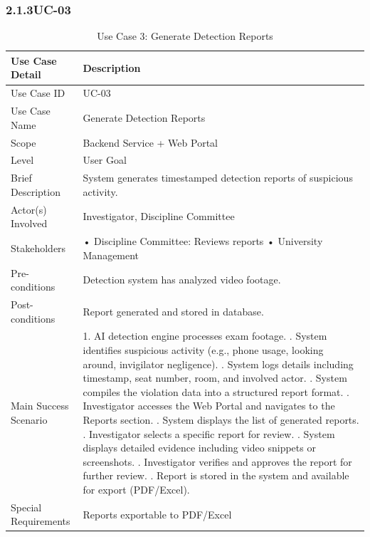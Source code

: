 \clearpage

\subsubsection*{2.1.3\quad UC-03}
\begin{longtable}{|p{5cm}|p{10cm}|}
\caption{Use Case 3: Generate Detection Reports}\label{uc03} \\
\hline
\textbf{Use Case Detail} & \textbf{Description} \\ \hline
Use Case ID & UC-03 \\ \hline
Use Case Name & Generate Detection Reports \\ \hline
Scope & Backend Service + Web Portal \\ \hline
Level & User Goal \\ \hline
Brief Description & System generates timestamped detection reports of suspicious activity. \\ \hline
Actor(s) Involved & Investigator, Discipline Committee \\ \hline
Stakeholders & • Discipline Committee: Reviews reports \newline • University Management \\ \hline
Pre-conditions & Detection system has analyzed video footage. \\ \hline
Post-conditions & Report generated and stored in database. \\ \hline
Main Success Scenario & 
1. AI detection engine processes exam footage. \newline
2. System identifies suspicious activity (e.g., phone usage, looking around, invigilator negligence). \newline
3. System logs details including timestamp, seat number, room, and involved actor. \newline
4. System compiles the violation data into a structured report format. \newline
5. Investigator accesses the Web Portal and navigates to the Reports section. \newline
6. System displays the list of generated reports. \newline
7. Investigator selects a specific report for review. \newline
8. System displays detailed evidence including video snippets or screenshots. \newline
9. Investigator verifies and approves the report for further review. \newline
10. Report is stored in the system and available for export (PDF/Excel). \\ \hline

Special Requirements & Reports exportable to PDF/Excel \\ \hline

\end{longtable}

